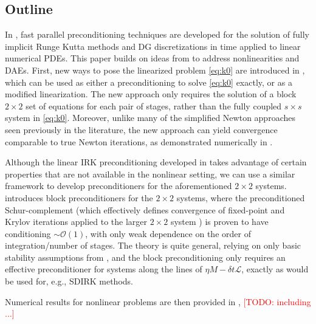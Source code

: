 \documentclass[review]{siamart}
\makeatletter
\newcommand{\todo}[1]{\textcolor{red}{[TODO\@: #1]}}
\makeatother
\begin{document}
\subsection{Outline}\label{sec:intro:outline}

In \cite{irk1}, fast parallel preconditioning techniques are developed for
the solution of fully implicit Runge Kutta methods and DG discretizations
in time applied to linear numerical PDEs. This paper builds on ideas from
\cite{irk1} to address nonlinearities and DAEs. First, new ways to pose the
linearized problem \eqref{eq:k0} are introduced in ,
which can be used as either a preconditioning to solve \eqref{eq:k0} exactly,
or as a modified linearization. The new approach only requires the solution
of a block $2\times 2$ set of equations for each pair of stages, rather than
the fully coupled $s\times s$ system in \eqref{eq:k0}. Moreover, unlike many
of the simplified Newton approaches seen previously in the literature, the
new approach can yield convergence comparable to true Newton iterations, as
demonstrated numerically in .

Although the linear IRK preconditioning developed in \cite{irk1} takes
advantage of certain properties that are not available in the nonlinear
setting, we can use a similar framework to develop preconditioners for the
aforementioned $2\times 2$ systems.  introduces block
preconditioners for the $2\times 2$ systems, where the preconditioned
Schur-complement (which effectively defines convergence of fixed-point
and Krylov iterations applied to the larger $2\times 2$ system
\cite{2x2block}) is proven to have conditioning $\sim\mathcal{O}(1)$,
with only weak dependence on the order of integration/number of stages.
The theory is quite general, relying on only basic stability assumptions
from , and the block preconditioning only requires
an effective preconditioner for systems along the lines of
$\eta M - \delta t\mathcal{L}$, exactly as would be used for, e.g.,
SDIRK methods.

Numerical results for nonlinear problems are then provided in
, \todo{including ...}


\end{document}
